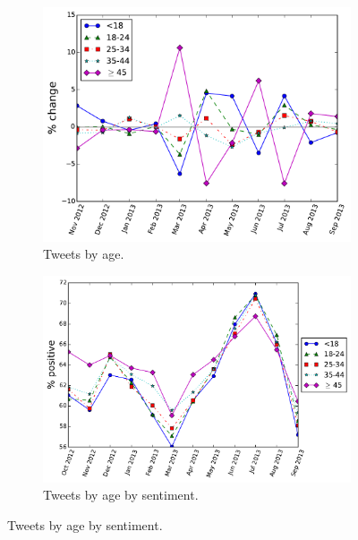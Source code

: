 \documentclass{sig-alternate}
\begin{document}
\begin{figure}[t]
  \caption{Tweets by age and sentiment.}
  \begin{subfigure}{.9\columnwidth}
    \centering
    \caption{Tweets by age. \label{f.age}}
    \includegraphics[width=\columnwidth]{nb/ages.pdf}
  \end{subfigure}
  \hspace{.5in}
  \begin{subfigure}{\columnwidth}
    \centering
    \caption{Tweets by age by sentiment.\label{f.age.sentiment}}
    \includegraphics[width=\columnwidth]{nb/age_sentiment.pdf}
  \end{subfigure}
\end{figure}
\end{document}
